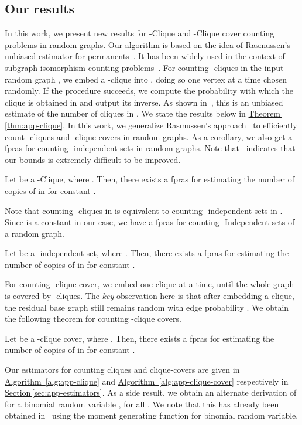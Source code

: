 \documentclass[runningheads,a4paper]{llncs}
\newcounter{obs}
\newcommand{\Sec}[1]{\hyperref[sec:#1]{Section\,\ref*{sec:#1}}} \newcommand{\Eqn}[1]{\hyperref[eq:#1]{(\ref*{eq:#1})}} \newcommand{\Fig}[1]{\hyperref[fig:#1]{Fig.\,\ref*{fig:#1}}} \newcommand{\Tab}[1]{\hyperref[tab:#1]{Tab.\,\ref*{tab:#1}}} \newcommand{\Thm}[1]{\hyperref[thm:#1]{Theorem\,\ref*{thm:#1}}} \newcommand{\Fact}[1]{\hyperref[fact:#1]{Fact\,\ref*{fact:#1}}} \newcommand{\Lem}[1]{\hyperref[lem:#1]{Lemma\,\ref*{lem:#1}}} \newcommand{\Prop}[1]{\hyperref[prop:#1]{Prop.~\ref*{prop:#1}}} \newcommand{\Cor}[1]{\hyperref[cor:#1]{Corollary~\ref*{cor:#1}}} \newcommand{\Conj}[1]{\hyperref[conj:#1]{Conjecture~\ref*{conj:#1}}} \newcommand{\Def}[1]{\hyperref[def:#1]{Definition~\ref*{def:#1}}} \newcommand{\Alg}[1]{\hyperref[alg:#1]{Algorithm~\ref*{alg:#1}}} \newcommand{\Ex}[1]{\hyperref[ex:#1]{Ex.~\ref*{ex:#1}}} \newcommand{\Clm}[1]{\hyperref[clm:#1]{Claim~\ref*{clm:#1}}} \newcommand{\Obs}[1]{\hyperref[obs:#1]{Observation~\ref*{clm:#1}}}
\begin{document}
\subsection{Our results}
In this work, we present new results for -Clique and -Clique cover counting problems  in random graphs. Our algorithm is based on the idea of Rasmussen's unbiased estimator for permanents~\cite{R94}. 
It has been widely used in the context of subgraph isomorphism counting problems~\cite{R97,FK05,FK08}. For counting -cliques in the input random graph , we embed a -clique into , doing so one vertex at a time chosen randomly. 
If the procedure succeeds, we compute the probability with which the clique is obtained in  
and output its inverse. As shown in~\cite{FK08}, this is an unbiased estimate of the number of cliques in . We state the results below in \Thm{app-clique}.  
In this work, we generalize Rasmussen's approach~\cite{R94} to efficiently count -cliques and -clique covers in random graphs. As a corollary, we also get a fpras for counting -independent sets in random graphs. 
Note that~\cite{CE11} indicates that our bounds is extremely difficult to be improved. 
\begin{theorem}\label{thm:app-clique}
Let  be a -Clique, where . Then, there exists a fpras for estimating the number of copies of  in  for constant .
\end{theorem}

Note that counting -cliques in  is equivalent to counting -independent sets in . Since  is a constant in our case, we have a fpras for counting -Independent sets of a random graph.

\begin{theorem}\label{cor:app-ind-sets}
Let  be a -independent set, where . Then, there exists a fpras for estimating the number of copies of  in  for constant .
\end{theorem}

For counting -clique cover, we embed one clique at a time, until the whole graph is covered by -cliques. The {\em key} observation here is that after embedding a clique, the residual base graph still remains random with edge probability . We obtain the following theorem for counting -clique covers.
\begin{theorem}\label{thm:app-clique-covers}
Let  be a -clique cover, where .  Then, there exists a fpras for estimating the number of copies of  in  for constant .
\end{theorem}

 Our estimators for counting cliques and clique-covers are given in \Alg{app-clique} and \Alg{app-clique-cover} respectively in \Sec{app-estimators}.  As a side result, we obtain an alternate derivation of   for a binomial random variable , for all . We note that this has already been obtained in~\cite{K08a} 
using the moment generating function for binomial random variable. 
\end{document}
